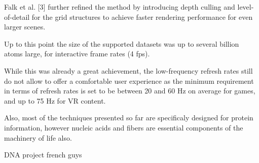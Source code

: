 Falk et al. [3] further refined the method by introducing depth culling and level-of-detail for the grid structures to achieve faster rendering performance for even larger scenes.

Up to this point the size of the supported datasets was up to several billion atoms large, for interactive frame rates (4 fps).

While this was already a great achievement, the low-frequency refresh rates still do not allow to offer a comfortable user experience as the minimum requirement in terms of refresh rates is set to be between 20 and 60 Hz on average for games, and up to 75 Hz for VR content.


Also, most of the techniques presented so far are specificaly designed for protein information, however nucleic acids and fibers are essential components of the machinery of life also.

DNA project french guys


%
%
%
%
%
%
%
%
%
%
%
%
%
%
%
%



